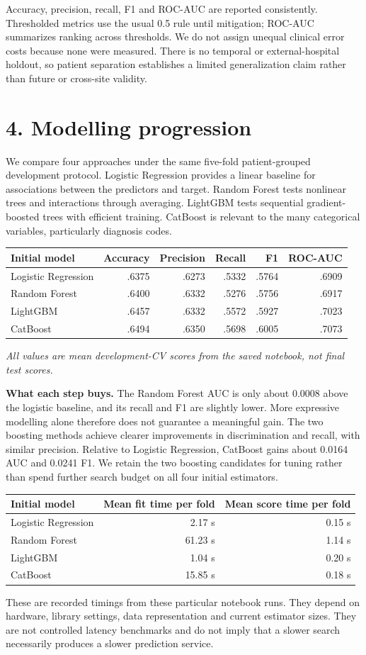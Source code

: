\documentclass[11pt,a4paper]{article}
\newcommand{\pageheading}[2]{\section*{\color{ink}#1. #2}}
\newcommand{\nextpage}{\clearpage}
\begin{document}
Accuracy, precision, recall, F1 and ROC-AUC are reported consistently. Thresholded metrics use the usual 0.5 rule until mitigation; ROC-AUC summarizes ranking across thresholds. We do not assign unequal clinical error costs because none were measured. There is no temporal or external-hospital holdout, so patient separation establishes a limited generalization claim rather than future or cross-site validity.

\nextpage
\pageheading{4}{Modelling progression}
We compare four approaches under the same five-fold patient-grouped development protocol. Logistic Regression provides a linear baseline for associations between the predictors and target. Random Forest tests nonlinear trees and interactions through averaging. LightGBM tests sequential gradient-boosted trees with efficient training. CatBoost is relevant to the many categorical variables, particularly diagnosis codes.

\begin{center}\small\begin{tabular}{lrrrrr}\toprule
Initial model & Accuracy & Precision & Recall & F1 & ROC-AUC\\\midrule
Logistic Regression & .6375 & .6273 & .5332 & .5764 & .6909\\
Random Forest & .6400 & .6332 & .5276 & .5756 & .6917\\
LightGBM & .6457 & .6332 & .5572 & .5927 & .7023\\
CatBoost & .6494 & .6350 & .5698 & .6005 & .7073\\\bottomrule
\end{tabular}\end{center}
\textit{All values are mean development-CV scores from the saved notebook, not final test scores.}

\textbf{What each step buys.} The Random Forest AUC is only about 0.0008 above the logistic baseline, and its recall and F1 are slightly lower. More expressive modelling alone therefore does not guarantee a meaningful gain. The two boosting methods achieve clearer improvements in discrimination and recall, with similar precision. Relative to Logistic Regression, CatBoost gains about 0.0164 AUC and 0.0241 F1. We retain the two boosting candidates for tuning rather than spend further search budget on all four initial estimators.

\begin{center}\begin{tabular}{lrr}\toprule
Initial model & Mean fit time per fold & Mean score time per fold\\\midrule
Logistic Regression & 2.17 s & 0.15 s\\
Random Forest & 61.23 s & 1.14 s\\
LightGBM & 1.04 s & 0.20 s\\
CatBoost & 15.85 s & 0.18 s\\\bottomrule
\end{tabular}\end{center}
These are recorded timings from these particular notebook runs. They depend on hardware, library settings, data representation and current estimator sizes. They are not controlled latency benchmarks and do not imply that a slower search necessarily produces a slower prediction service.
\end{document}
